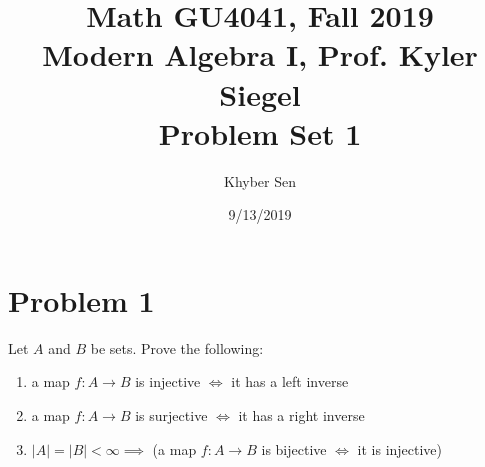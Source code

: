 \documentclass[fleqn]{article}
\title{
Math GU4041, Fall 2019 \\
Modern Algebra I, Prof. Kyler Siegel \\
Problem Set 1
}
\author{Khyber Sen}
\date{9/13/2019}
\begin{document}
    
    \maketitle
    
    \section{Problem 1}
    Let $A$ and $B$ be sets.  Prove the following:
        \begin{enumerate}
            \item a map $f: A \to B$ is injective $\iff$ it has a left inverse
            \item a map $f: A \to B$ is surjective $\iff$ it has a right inverse
            \item $|A| = |B| < \infty \implies$ (a map $f: A \to B$ is bijective $\iff$ it is injective)
        \end{enumerate}
        
\end{document}
